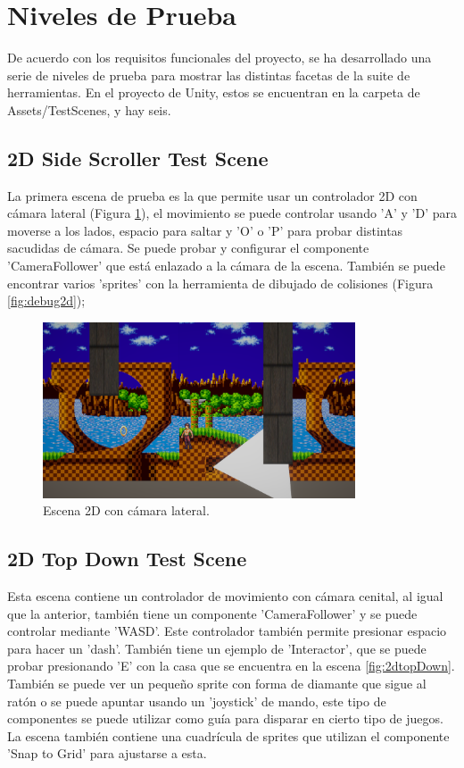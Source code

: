 \section{Niveles de Prueba}
De acuerdo con los requisitos funcionales del proyecto, se ha desarrollado una serie de niveles de prueba para mostrar las distintas facetas de la suite de herramientas. En el proyecto de Unity, estos se encuentran
en la carpeta de Assets/TestScenes, y hay seis.

\subsection{2D Side Scroller Test Scene}
La primera escena de prueba es la que permite usar un controlador 2D con cámara lateral (Figura \ref{fig:2dSideScroller}), el movimiento se puede controlar usando 'A' y 'D' para moverse a 
los lados, espacio para saltar y 'O' o 'P' para probar distintas sacudidas de cámara. Se puede probar y configurar el componente 'CameraFollower' que está 
enlazado a la cámara de la escena. También se puede encontrar varios 'sprites' con la herramienta de dibujado de colisiones (Figura \ref{fig:debug2d});

\begin{figure}[H]
   \centering
     \includegraphics[width=350px,clip=true]{2dSideScrollerTestScene.png}
   \caption{Escena 2D con cámara lateral.}
   \label{fig:2dSideScroller}
\end{figure}

\subsection{2D Top Down Test Scene}
Esta escena contiene un controlador de movimiento con cámara cenital, al igual que la anterior, también tiene un componente 'CameraFollower' y se puede
controlar mediante 'WASD'. Este controlador también permite presionar espacio para hacer un 'dash'. También tiene un ejemplo de 'Interactor', que se puede
 probar presionando 'E' con la casa que se encuentra en la escena \ref{fig:2dtopDown}. También se puede ver un pequeño sprite con forma de diamante que sigue 
 al ratón o se puede apuntar usando un 'joystick' de mando, este tipo de componentes se puede utilizar como guía para disparar en cierto tipo de juegos. La 
 escena también contiene una cuadrícula de sprites que utilizan el componente 'Snap to Grid' para ajustarse a esta.

